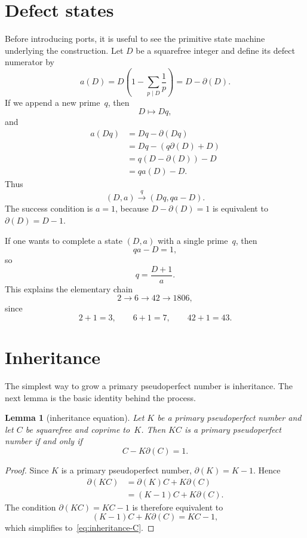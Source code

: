 \documentclass[11pt]{amsart}
\theoremstyle{plain}
\newtheorem{lemma}[theorem]{Lemma}
\theoremstyle{definition}
\theoremstyle{remark}
\newcommand{\dd}{\partial}
\begin{document}
\section{Defect states}

Before introducing ports, it is useful to see the primitive state machine underlying the construction.  Let $D$ be a squarefree integer and define its defect numerator by
\[
        a(D)=D\left(1-\sum_{p\mid D}\frac1p\right)=D-\dd(D).
\]
If we append a new prime~$q$, then
\[
        D\mapsto Dq,
\]
and
\[
\begin{aligned}
        a(Dq)
        &=Dq-\dd(Dq)\\
        &=Dq-(q\dd(D)+D)\\
        &=q(D-\dd(D))-D\\
        &=qa(D)-D.
\end{aligned}
\]
Thus
\begin{equation}\label{eq:defect-machine}
        (D,a)\xrightarrow{q}(Dq,qa-D).
\end{equation}
The success condition is $a=1$, because $D-\dd(D)=1$ is equivalent to $\dd(D)=D-1$.

If one wants to complete a state $(D,a)$ with a single prime~$q$, then
\[
        qa-D=1,
\]
so
\begin{equation}\label{eq:one-step-defect}
        q=\frac{D+1}{a}.
\end{equation}
This explains the elementary chain
\[
        2\to6\to42\to1806,
\]
since
\[
        2+1=3,
        \qquad
        6+1=7,
        \qquad
        42+1=43.
\]

\section{Inheritance}

The simplest way to grow a primary pseudoperfect number is inheritance.  The next lemma is the basic identity behind the process.

\begin{lemma}[inheritance equation]\label{lem:inheritance-equation}
Let $K$ be a primary pseudoperfect number and let $C$ be squarefree and coprime to~$K$.  Then $KC$ is a primary pseudoperfect number if and only if
\begin{equation}\label{eq:inheritance-C}
        C-K\dd(C)=1.
\end{equation}
\end{lemma}

\begin{proof}
Since $K$ is a primary pseudoperfect number, $\dd(K)=K-1$.  Hence
\[
\begin{aligned}
        \dd(KC)
        &=\dd(K)C+K\dd(C)\\
        &=(K-1)C+K\dd(C).
\end{aligned}
\]
The condition $\dd(KC)=KC-1$ is therefore equivalent to
\[
        (K-1)C+K\dd(C)=KC-1,
\]
which simplifies to~\eqref{eq:inheritance-C}.
\end{proof}
\end{document}
